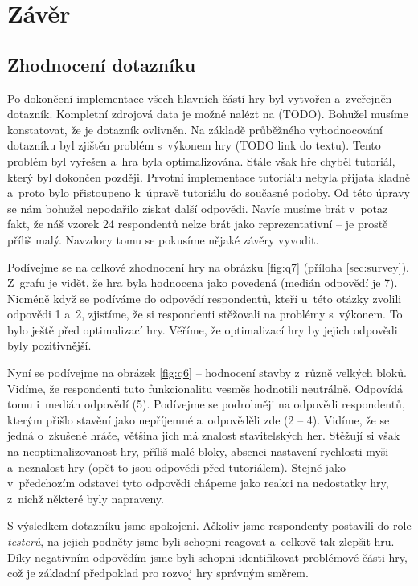 
\chapter{Závěr}

\section{Zhodnocení dotazníku}
\label{sec:quest}

Po dokončení implementace všech hlavních částí hry byl vytvořen a~zveřejněn dotazník. Kompletní zdrojová data je možné nalézt na (TODO). Bohužel musíme konstatovat, že je dotazník ovlivněn. Na základě průběžného vyhodnocování dotazníku byl zjištěn problém s~výkonem hry (TODO link do textu). Tento problém byl vyřešen a~hra byla optimalizována. Stále však hře chyběl tutoriál, který byl dokončen později. Prvotní implementace tutoriálu nebyla přijata kladně a~proto bylo přistoupeno k~úpravě tutoriálu do současné podoby. Od této úpravy se nám bohužel nepodařilo získat další odpovědi. Navíc musíme brát v~potaz fakt, že náš vzorek 24 respondentů nelze brát jako reprezentativní -- je prostě příliš malý. Navzdory tomu se pokusíme nějaké závěry vyvodit.

Podívejme se na celkové zhodnocení hry na obrázku \ref{fig:q7} (příloha \ref{sec:survey}). Z~grafu je vidět, že hra byla hodnocena jako povedená (medián odpovědí je 7). Nicméně když se podíváme do odpovědí respondentů, kteří u~této otázky zvolili odpovědi 1 a~2, zjistíme, že si respondenti stěžovali na problémy s~výkonem. To bylo ještě před optimalizací hry. Věříme, že optimalizací hry by jejich odpovědi byly pozitivnější. 

Nyní se podívejme na obrázek \ref{fig:q6} -- hodnocení stavby z~různě velkých bloků. Vidíme, že respondenti tuto funkcionalitu vesměs hodnotili neutrálně. Odpovídá tomu i~medián odpovědí (5). Podívejme se podrobněji na odpovědi respondentů, kterým přišlo stavění jako nepříjemné a~odpověděli zde (2 -- 4). Vidíme, že se jedná o~zkušené hráče, většina jich má znalost stavitelských her. Stěžují si však na neoptimalizovanost hry, příliš malé bloky, absenci nastavení rychlosti myši a~neznalost hry (opět to jsou odpovědi před tutoriálem). Stejně jako v~předchozím odstavci tyto odpovědi chápeme jako reakci na nedostatky hry, z~nichž některé byly napraveny.

S výsledkem dotazníku jsme spokojeni. Ačkoliv jsme respondenty postavili do role \textit{testerů}, na jejich podněty jsme byli schopni reagovat a~celkově tak zlepšit hru. Díky negativním odpovědím jsme byli schopni identifikovat problémové části hry, což je základní předpoklad pro rozvoj hry správným směrem.

